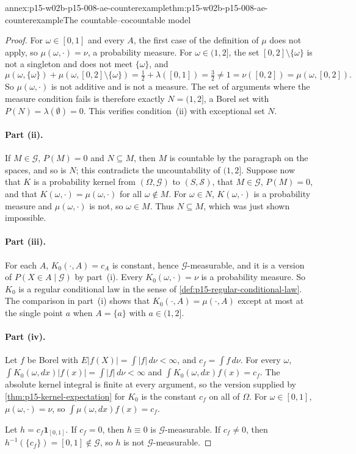 \begin{annexitem}{annex:p15-w02b-p15-008-ae-counterexample}{thm:p15-w02b-p15-008-ae-counterexample}{The countable--cocountable model}
\begin{proof}
For \(\omega\in[0,1]\) and every \(A\), the first case of the definition
of \(\mu\) does not apply, so \(\mu(\omega,\cdot)=\nu\), a probability
measure. For \(\omega\in(1,2]\), the set \([0,2]\setminus\{\omega\}\) is not
a singleton and does not meet \(\{\omega\}\), and
\[
 \mu(\omega,\{\omega\})+\mu(\omega,[0,2]\setminus\{\omega\})
   =\tfrac12+\lambda([0,1])=\tfrac32
   \neq1=\nu([0,2])=\mu(\omega,[0,2]).
\]
So \(\mu(\omega,\cdot)\) is not additive and is not a measure. The set of
arguments where the measure condition fails is therefore exactly
\(N=(1,2]\), a Borel set with \(P(N)=\lambda(\emptyset)=0\). This verifies
condition~(ii) with exceptional set \(N\).

\paragraph{Part (ii).}
If \(M\in\mathcal G\), \(P(M)=0\) and \(N\subseteq M\), then \(M\) is
countable by the paragraph on the spaces, and so is \(N\); this contradicts the
uncountability of \((1,2]\). Suppose now that \(K\) is a probability kernel
from \((\Omega,\mathcal G)\) to \((S,\mathcal S)\), that
\(M\in\mathcal G\), \(P(M)=0\), and that \(K(\omega,\cdot)=\mu(\omega,\cdot)\)
for all \(\omega\notin M\). For \(\omega\in N\), \(K(\omega,\cdot)\) is a
probability measure and \(\mu(\omega,\cdot)\) is not, so \(\omega\in M\).
Thus \(N\subseteq M\), which was just shown impossible.

\paragraph{Part (iii).}
For each \(A\), \(K_0(\cdot,A)=c_A\) is constant, hence
\(\mathcal G\)-measurable, and it is a version of
\(P(X\in A\mid\mathcal G)\) by part~(i). Every \(K_0(\omega,\cdot)=\nu\) is
a probability measure. So \(K_0\) is a regular conditional law in the sense
of \cref{def:p15-regular-conditional-law}. The comparison in part~(i)
shows that \(K_0(\cdot,A)=\mu(\cdot,A)\) except at most at the single point
\(a\) when \(A=\{a\}\) with \(a\in(1,2]\).

\paragraph{Part (iv).}
Let \(f\) be Borel with \(E|f(X)|=\int|f|\,d\nu<\infty\), and
\(c_f=\int f\,d\nu\). For every \(\omega\),
\(\int K_0(\omega,dx)|f(x)|=\int|f|\,d\nu<\infty\) and
\(\int K_0(\omega,dx)f(x)=c_f\). The absolute kernel integral is finite at
every argument, so the version supplied by
\cref{thm:p15-kernel-expectation} for \(K_0\) is the constant \(c_f\) on
all of \(\Omega\). For \(\omega\in[0,1]\),
\(\mu(\omega,\cdot)=\nu\), so \(\int\mu(\omega,dx)f(x)=c_f\).

Let \(h=c_f\mathbf1_{[0,1]}\). If \(c_f=0\), then \(h\equiv0\) is
\(\mathcal G\)-measurable. If \(c_f\neq0\), then
\(h^{-1}(\{c_f\})=[0,1]\notin\mathcal G\), so \(h\) is not
\(\mathcal G\)-measurable.
\end{proof}
\end{annexitem}

